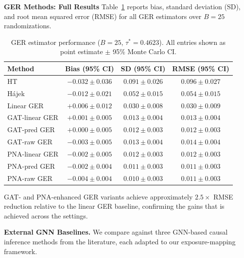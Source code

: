 \documentclass{article}
\theoremstyle{plain}
\theoremstyle{definition}
\theoremstyle{remark}
\begin{document}
\textbf{GER Methods: Full Results} Table~\ref{tab:grr_full} reports bias, standard deviation (SD), and root mean
squared error (RMSE) for all GER estimators over $B = 25$ randomizations.

\begin{table}[ht]
  \centering
  \caption{GER estimator performance ($B = 25$, $\tau^* = 0.4623$).
           All entries shown as point estimate $\pm$ 95\% Monte Carlo CI\@.}
  \label{tab:grr_full}
  \begin{tabular}{lccc}
    \toprule
    Method
      & Bias (95\% CI)
      & SD (95\% CI)
      & RMSE (95\% CI) \\
    \midrule
    HT
      & $-0.032 \pm 0.036$
      & $0.091 \pm 0.026$
      & $0.096 \pm 0.027$ \\
    H\'{a}jek
      & $-0.012 \pm 0.021$
      & $0.052 \pm 0.015$
      & $0.054 \pm 0.015$ \\
    Linear GER
      & $+0.006 \pm 0.012$
      & $0.030 \pm 0.008$
      & $0.030 \pm 0.009$ \\
    \midrule
    GAT-linear GER
      & $+0.001 \pm 0.005$
      & $0.013 \pm 0.004$
      & $0.013 \pm 0.004$ \\
    GAT-pred GER
      & $+0.000 \pm 0.005$
      & $0.012 \pm 0.003$
      & $0.012 \pm 0.003$ \\
    GAT-raw GER
      & $-0.003 \pm 0.005$
      & $0.013 \pm 0.004$
      & $0.014 \pm 0.004$ \\
    PNA-linear GER
      & $-0.002 \pm 0.005$
      & $0.012 \pm 0.003$
      & $0.012 \pm 0.003$ \\
    PNA-pred GER
      & $-0.002 \pm 0.004$
      & $0.011 \pm 0.003$
      & $0.011 \pm 0.003$ \\
    PNA-raw GER
      & $-0.004 \pm 0.004$
      & $0.010 \pm 0.003$
      & $0.011 \pm 0.003$ \\
    \bottomrule
  \end{tabular}
\end{table}

GAT- and PNA-enhanced GER variants achieve approximately $2.5\times$ RMSE
reduction relative to the linear GER baseline, confirming the gains that is achieved across the settings. 

\textbf{External GNN Baselines. } We compare against three GNN-based causal inference methods from the literature,
each adapted to our exposure-mapping framework.
\end{document}
